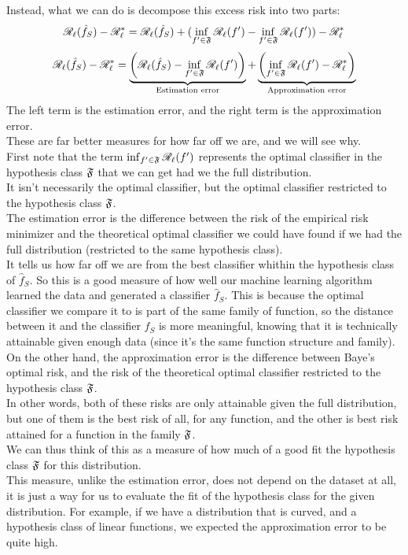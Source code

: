 \documentclass[12pt]{article}
\begin{document}
Instead, what we can do is decompose this excess
risk into two parts:
\[ \mathscr{R}_\ell(\hat{f}_S) - \mathscr{R}_\ell^*
= \mathscr{R}_\ell(\hat{f}_S)
+ (\inf_{f' \in \mathfrak{F}} \mathscr{R}_\ell(f')
- \inf_{f' \in \mathfrak{F}} \mathscr{R}_\ell(f')) 
- \mathscr{R}_\ell^* \]
\[ \mathscr{R}_\ell(\hat{f}_S) - \mathscr{R}_\ell^*
= \underbrace{\left( \mathscr{R}_\ell(\hat{f}_S)
- \inf_{f' \in \mathfrak{F}} \mathscr{R}_\ell(f') \right)}_
{\text{Estimation error}}
+ \underbrace{\left( \inf_{f' \in \mathfrak{F}} \mathscr{R}_\ell(f')
- \mathscr{R}_\ell^* \right)}_{\text{Approximation error}} \]
The left term is the estimation error,
and the right term is the approximation error. \\
These are far better measures
for how far off we are,
and we will see why. \\

First note that the term 
$\inf_{f' \in \mathfrak{F}} \mathscr{R}_\ell(f')$
represents the optimal classifier 
in the hypothesis class $\mathfrak{F}$
that we can get had we the full distribution. \\
It isn't necessarily the optimal classifier,
but the optimal classifier restricted
to the hypothesis class $\mathfrak{F}$. \\

The estimation error is the difference
between the risk of the empirical risk
minimizer
and the theoretical optimal classifier
we could have found if we had the full
distribution
(restricted to the same hypothesis class). \\
It tells us how far off we are
from the best classifier whithin the hypothesis
class of $\hat{f}_S$.
So this is a good measure of how well
our machine learning algorithm learned
the data and generated a classifier $\hat{f}_S$.
This is because the optimal classifier
we compare it to is part of the same
family of function, so the distance
between it and the classifier $\hat{f}_S$
is more meaningful,
knowing that it is technically attainable
given enough data
(since it's the same function structure
and family). \\

On the other hand, the approximation error
is the difference between Baye's optimal risk,
and the risk of the theoretical
optimal classifier
restricted to the hypothesis class $\mathfrak{F}$. \\
In other words, both of these
risks are only attainable given the full
distribution,
but one of them is the best risk of all,
for any function, and the other is best
risk attained for a function in the family $\mathfrak{F}$. \\
We can thus think of this as a measure
of how much of a good fit the hypothesis
class $\mathfrak{F}$ for this distribution. \\
This measure,
unlike the estimation error,
 does not depend on the dataset at all,
it is just a way for us to evaluate the fit
of the hypothesis class for the given 
distribution.
For example, if we have a distribution
that is curved, and a hypothesis class
of linear functions, 
we expected the approximation error to be
quite high. \\
\end{document}
